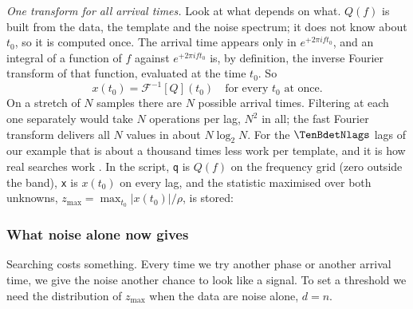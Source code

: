 \emph{One transform for all arrival times.} Look at what depends on what. $Q(f)$ is built from the data, the template
and the noise spectrum; it does not know about $t_0$, so it is computed once. The arrival time appears only in
$e^{+2\pi ift_0}$, and an integral of a function of $f$ against $e^{+2\pi ift_0}$ is, by definition, the inverse
Fourier transform of that function, evaluated at the time $t_0$. So
\begin{equation}
  x(t_0)=\mathcal F^{-1}[Q](t_0)\quad\text{for every }t_0\text{ at once.}
\end{equation}
On a stretch of $N$ samples there are $N$ possible arrival times. Filtering at each one separately would take $N$
operations per lag, $N^2$ in all; the fast Fourier transform delivers all $N$ values in about $N\log_2N$. For the
$\TenBdetNlags$ lags of our example that is about a thousand times less work per template,
and it is how real searches work \cite{AllenFINDCHIRP2012}. In the script, \texttt{q} is $Q(f)$ on the frequency grid
(zero outside the band), \texttt{x} is $x(t_0)$ on every lag, and the statistic maximised over both unknowns,
$z_{\max}=\max_{t_0}|x(t_0)|/\rho$, is stored:


\subsubsection*{What noise alone now gives}

Searching costs something. Every time we try another phase or another arrival time, we give the noise another chance
to look like a signal. To set a threshold we need the distribution of $z_{\max}$ when the data are noise alone, $d=n$.


